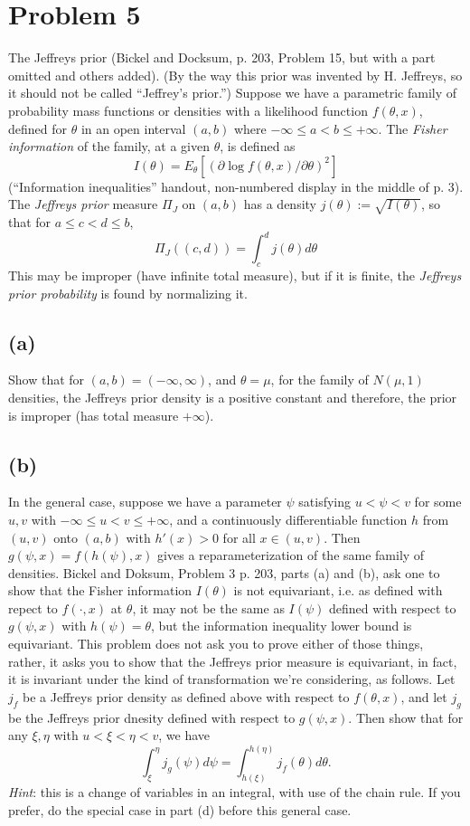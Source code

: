\documentclass[11pt]{article}
\newcommand{\ProbS}{\iftrue}
\newcommand{\ProbE}{\fi}
\begin{document}
\section{Problem 5}
\ProbS
The Jeffreys prior (Bickel and Docksum, p. 203, Problem 15, but with a part omitted and others added). (By the way this prior was invented by H. Jeffreys, so it should not be called ``Jeffrey's prior.'')
Suppose we have a parametric family of probability mass functions or densities with a likelihood function $f(\theta, x)$, defined for $\theta$ in an open interval $(a,b)$ where $-\infty \leq a < b \leq +\infty$.
The \emph{Fisher information} of the family, at a given $\theta$, is defined as
$$
I(\theta) = E_{\theta}[(\partial \log f(\theta, x) / \partial \theta)^2]
$$
(``Information inequalities'' handout, non-numbered display in the middle of p. 3). The \emph{Jeffreys prior} measure $\Pi_{J}$ on $(a,b)$ has a density
$
j(\theta) := \sqrt{I(\theta)}
$, so that for
$a \leq c < d \leq b$,
$$
\Pi_{J}((c,d)) = \int_{c}^{d} j(\theta) d\theta
$$
This may be improper (have infinite total measure), but if it is finite, the \emph{Jeffreys prior probability} is found by normalizing it.
\ProbE

\subsection*{(a)}
\ProbS
Show that for $(a,b) = (-\infty, \infty)$, and $\theta = \mu$, for the family of $N(\mu, 1)$ densities, the Jeffreys prior density is a positive constant and therefore, the prior is improper (has total measure $+\infty$).
\ProbE

\subsection*{(b)}
\ProbS
In the general case, suppose we have a parameter $\psi$ satisfying
$u < \psi < v$ for some $u,v$ with $-\infty \leq u < v \leq +\infty$,
and a continuously differentiable function $h$ from $(u,v)$ onto $(a,b)$ with $h'(x)>0$ for all $x \in (u,v)$.
Then $g(\psi, x) = f(h(\psi), x)$ gives a reparameterization of the same family of densities.
Bickel and Doksum, Problem 3 p. 203, parts (a) and (b), ask one to show that the Fisher information $I(\theta)$ is not equivariant, i.e. as defined with repect to $f(\cdot, x)$ at $\theta$, it may not be the same as $I(\psi)$ defined with respect to $g(\psi, x)$ with $h(\psi)=\theta$, but the information inequality lower bound is equivariant.
This problem does not ask you to prove either of those things, rather, it asks you to show that the Jeffreys prior measure is equivariant, in fact, it is invariant under the kind of transformation we're considering, as follows.
Let $j_f$ be a Jeffreys prior density as defined above with respect to $f(\theta, x)$, and let $j_g$ be the Jeffreys prior dnesity defined with respect to $g(\psi, x)$. Then show that for any $\xi, \eta$ with $u < \xi < \eta < v$, we have
$$
\int_{\xi}^{\eta} j_g(\psi)d\psi = \int_{h(\xi)}^{h(\eta)} j_f(\theta) d\theta.
$$
\emph{Hint}: this is a change of variables in an integral, with use of the chain rule. If you prefer, do the special case in part (d) before this general case.
\ProbE
\end{document}

